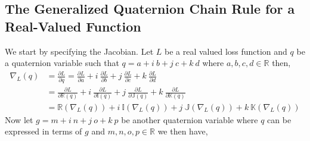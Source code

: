 \documentclass[conference]{IEEEtran}
\begin{document}
\subsection{The Generalized Quaternion Chain Rule for a Real-Valued Function}\label{a:diff}
We start by specifying the Jacobian.
Let $L$ be a real valued loss function and $q$ be a quaternion variable such that $q = a+\textit{i}~b+\textit{j}~c+\textit{k}~d$ where $a,b,c,d \in \mathbb{R}$ then,
\begin{align}
\nabla_L(q) &= \frac{\partial L}{\partial q} = \frac{\partial L}{\partial a} + \textit{i}~\frac{\partial L}{\partial b} + \textit{j}~\frac{\partial L}{\partial c} + \textit{k}~\frac{\partial L}{\partial d} \\ \nonumber
&= \frac{\partial L}{\partial \mathbb{R}(q)} + \textit{i}~\frac{\partial L}{\partial \mathbb{I}(q)} + \textit{j}~\frac{\partial L}{\partial \mathbb{J}(q)} + \textit{k}~\frac{\partial L}{\partial \mathbb{K}(q)} \\ \nonumber
&= \mathbb{R}(\nabla_L(q)) + i~\mathbb{I}(\nabla_L(q)) + j~\mathbb{J}(\nabla_L(q)) + k~\mathbb{K}(\nabla_L(q)) 
\label{eq:diff1}
\end{align}
Now let $g = m+\textit{i}~n+\textit{j}~o+\textit{k}~p$ be another quaternion variable where $q$ can be expressed in terms of $g$ and $m,n,o,p \in \mathbb{R}$ we then have,
\end{document}
